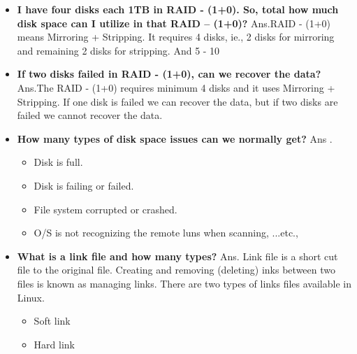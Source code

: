 \begin{enumerate}
\begin{enumerate}
{\begin{itemize}
\begin{itemize}
    \bigskip
    \bigskip

    \item \textbf{I have four disks each 1TB in RAID - (1+0). So, total how much disk space can I utilize in that RAID – 
    (1+0)?}
    \newline
    Ans.RAID - (1+0) means Mirroring + Stripping. It requires 4 disks, ie., 2 disks for mirroring and remaining 2 disks for 	stripping. And 5 - 10%
    
    \bigskip
    \bigskip

    \item \textbf{If two disks failed in RAID - (1+0), can we recover the data?}
    \newline
    Ans.The RAID - (1+0) requires minimum 4 disks and it uses Mirroring + Stripping. If one disk is failed we can 
    recover 	the data, but if two disks are failed we cannot recover the data.
    
    \bigskip
    \bigskip

    \item \textbf{How many types of disk space issues can we normally get?}
    \newline
    Ans . \begin{itemize}
              \item Disk is full.
              \item  Disk is failing or failed.
              \item  File system corrupted or crashed.
              \item  O/S is not recognizing the remote luns when scanning, ...etc.,
          \end{itemize}

    \bigskip
    \bigskip

    \item \textbf{What is a link file and how many types?}
    \newline
    Ans. Link file is a short cut file to the original file. Creating and removing  (deleting)  inks  between two files is known 	as managing links. There are two types of links files available in Linux.
      \begin{itemize}
        \item Soft link
        \item 	Hard link
      \end{itemize} 
   
    \bigskip
    \bigskip


\end{itemize}
\end{itemize}}
\end{enumerate}
\end{enumerate}
